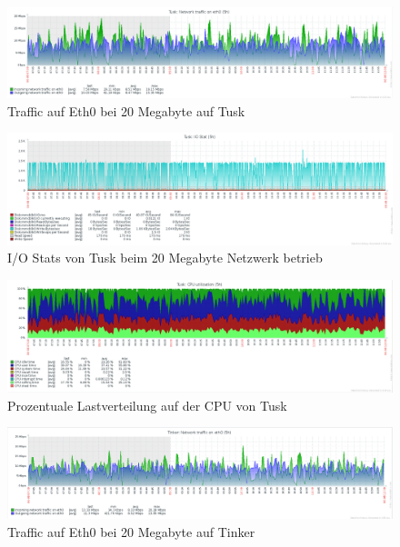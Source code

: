 \begin{figure}[htbp]
\centering
\includegraphics*[width=0.9\linewidth, angle=90]{Abb/ZabbixTusk/Standard/Standard20}

\caption{Traffic auf Eth0 bei 20 Megabyte auf Tusk}
\label{fig:Eth0TuskStandard}
\end{figure}


\begin{figure}[htbp]
\centering
\includegraphics*[width=0.9\linewidth, angle=90]{Abb/ZabbixTusk/Standard/IoStatStandard20}

\caption{I/O Stats von Tusk beim 20 Megabyte Netzwerk betrieb}
\label{fig:IoStatTuskStandard}
\end{figure} %

\begin{figure}[htbp]
\centering
\includegraphics*[width=0.9\linewidth, angle=90]{Abb/ZabbixTusk/Standard/CPUStandard20}

\caption{Prozentuale Lastverteilung auf der CPU von Tusk}
\label{fig:CPUTuskStandard}
\end{figure}

\begin{figure}[htbp]
\centering
\includegraphics*[width=0.9\linewidth, angle=90]{Abb/ZabbixTinker/Standard/Standard20}

\caption{Traffic auf Eth0 bei 20 Megabyte auf Tinker}
\label{fig:Eth0TuskStandard}
\end{figure}


